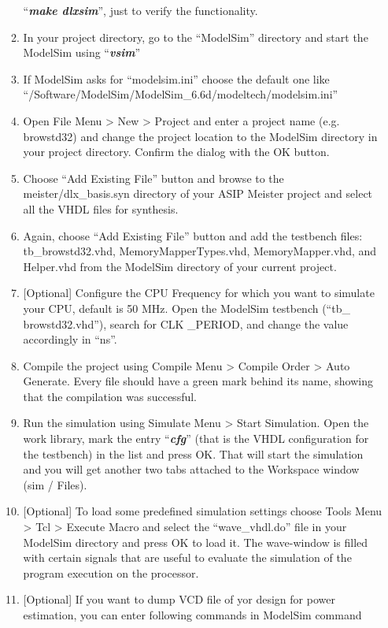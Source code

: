 \begin{enumerate}
\begin{enumerate}
	``\emph{\textbf{make dlxsim}}'', just to verify the functionality.
	\item
	In your project directory, go to the ``ModelSim'' directory and
	start the ModelSim using ``\emph{\textbf{vsim}}''
	\item
	If ModelSim asks for ``modelsim.ini'' choose the default one like
	``/Software/ModelSim/ModelSim\_6.6d/modeltech/modelsim.ini''
	\item
	Open File Menu \textgreater{} New \textgreater{} Project and enter a
	project name (e.g. browstd32) and change the project location to the
	ModelSim directory in your project directory. Confirm the dialog
	with the OK button.
	\item
	Choose ``Add Existing File'' button and browse to the
	meister/dlx\_basis.syn directory of your ASIP Meister project and
	select all the VHDL files for synthesis.
	\item
	Again, choose ``Add Existing File'' button and add the testbench
	files: tb\_browstd32.vhd, MemoryMapperTypes.vhd, MemoryMapper.vhd,
	and Helper.vhd from the ModelSim directory of your current project.
	\item
	{[}Optional{]} Configure the CPU Frequency for which you want to
	simulate your CPU, default is 50 MHz. Open the ModelSim testbench
	(``tb\_ browstd32.vhd''), search for CLK \_PERIOD, and change the
	value accordingly in ``ns''.
	\item
	Compile the project using Compile Menu \textgreater{} Compile Order
	\textgreater{} Auto Generate. Every file should have a green mark
	behind its name, showing that the compilation was successful.
	\item
	Run the simulation using Simulate Menu \textgreater{} Start
	Simulation. Open the work library, mark the entry
	``\emph{\textbf{cfg}}'' (that is the VHDL configuration for the
	testbench) in the list and press OK. That will start the simulation
	and you will get another two tabs attached to the Workspace window
	(sim / Files).
	\item
	{[}Optional{]} To load some predefined simulation settings choose
	Tools Menu \textgreater{} Tcl \textgreater{} Execute Macro and
	select the ``wave\_vhdl.do'' file in your ModelSim directory and
	press OK to load it. The wave-window is filled with certain signals
	that are useful to evaluate the simulation of the program execution
	on the processor.
	\item
	{[}Optional{]} If you want to dump VCD file of yor design for power
	estimation, you can enter following commands in ModelSim command

\end{enumerate}
\end{enumerate}
